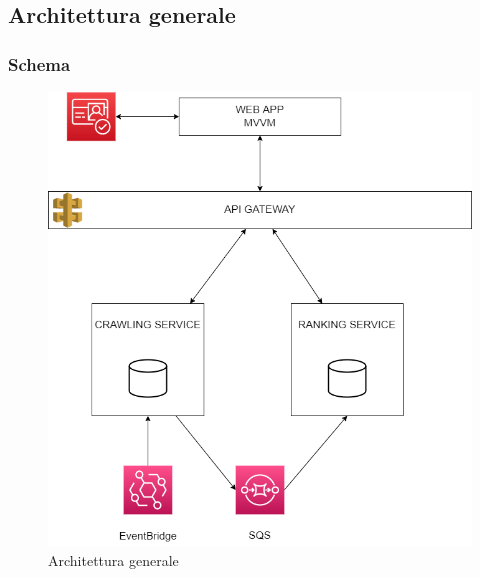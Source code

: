 \subsection{Architettura generale}

\subsubsection{Schema}
\begin{figure}[H]
    \centerfloat
    \includegraphics[scale=0.35]{Contenuto/Immagini/backend-architettura.png}
    \caption{Architettura generale}
\end{figure}

